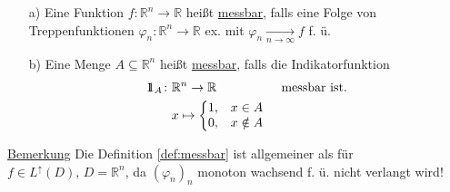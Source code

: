 \begin{definition}\label{def:messbar}
    \begin{itemize}
        \item[a)] Eine Funktion $f\colon \mathbb{R}^n\to\mathbb{R}$ heißt \underline{messbar}, falls eine Folge von Treppenfunktionen $\varphi_n\colon\mathbb{R}^n\to\mathbb{R}$ ex. mit $\varphi_n \xrightarrow[n\to\infty]{} f$ f. ü.
        \item[b)] Eine Menge $A\subseteq \mathbb{R}^n$ heißt \underline{messbar}, falls die Indikatorfunktion \begin{align*}
            \id_A\colon & \mathbb{R}^n\to\mathbb{R} & \text{ messbar ist.}\\
            &x\mapsto\left\{\begin{matrix*}
                1,&x\in A\\
                0,&x\notin A
            \end{matrix*}\right. &
        \end{align*}
    \end{itemize}
\end{definition}
\underline{Bemerkung} Die Definition \ref{def:messbar} ist allgemeiner als für $f\in L^{\uparrow}(D),\, D=\mathbb{R}^n$, da $(\varphi_n)_n$ monoton wachsend f. ü. nicht verlangt wird!

